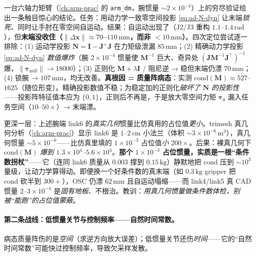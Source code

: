 \begin{insight}
\label{ins:ad-osc-illcond}
一台六轴力矩臂（\cref{ch:arm-prac} 的 \texttt{arm\_dm}，腕惯量 $\sim2\times10^{-4}$）上的穷尽验证给出一条触目惊心的结论。任务：用动力学一致零空间投影 \cref{eq:ad-N-dyn} 让末端\emph{锁死}、同时让手肘在零空间自运动。结果：自运动出现了（J2/J3 重构 $1.1$--$1.4\,\mathrm{rad}$），但\textbf{末端没收住（$\|\Delta\mathbf{x}\|\approx70$--$110\,\mathrm{mm}$，而非 $<10\,\mathrm{mm}$）}。四次定位尝试逐一排除：(1) 运动学投影 $\mathbf{N}=\mathbf{I}-\mathbf{J}^+\mathbf{J}$ 在力矩级泄漏 $85\,\mathrm{mm}$；(2) 精确动力学投影 \cref{eq:ad-N-dyn} \emph{数值爆炸}（腕 $2\times10^{-4}$ 惯量使 $\mathbf{M}^{-1}$ 巨大、奇异处 $(\mathbf{J}\mathbf{M}^{-1}\mathbf{J}^\top)^{-1}$ 爆，$\|\boldsymbol{\tau}_{\text{null}}\|\to18000$）；(3) 正则化 $\mathbf{M}+\lambda\mathbf{I}$ / 阻尼逆 → 稳但末端仍漂 $70\,\mathrm{mm}$；(4) 锁腕 → $107\,\mathrm{mm}$，均无改善。\textbf{真根因 = 质量阵病态}：实测 $\mathrm{cond}(\mathbf{M})\approx527$--$1625$（随位形变）。精确投影数值不稳；为稳定加的正则化\emph{破坏了 $\mathbf{N}$ 的投影性}——投影阵特征值本应为 $\{0,1\}$，正则后不再是，于是放大零空间力矩 $\boldsymbol{\tau}_0$ 漏入任务空间（$10$--$50\times$）→ 末端漂。
\end{insight}

\begin{insight}
\label{ins:ad-placeholder}
更深一层：上述腕端 link6 的\emph{真实几何}惯量比仿真用的占位值\emph{更小}。trimesh 真几何分析（\cref{ch:arm-prac}）显示 link6 是 $1$--$2\,\mathrm{cm}$ 小法兰（体积 $\sim3\times10^{-6}\,\mathrm{m}^3$），真几何惯量 $\sim5\times10^{-6}$——比仿真里填的 $1\times10^{-3}$ 占位值\emph{小 $200\times$}。后果：裸真几何下 $\mathrm{cond}(\mathbf{M})$ \emph{爆到 $1.3\times10^4$--$5.6\times10^4$}。\textbf{那个 $1\times10^{-3}$ 占位惯量，实质是一根“条件数拐杖”}——它（连同 link6 质量从 $0.003$ 撑到 $0.15\,\mathrm{kg}$）静默地把 $\mathrm{cond}$ 压到 $\sim10^3$ 量级，让动力学算得动。即便换一个好条件数的真末端（如 $0.3\,\mathrm{kg}$ gripper 把 $\mathrm{cond}$ 砍半到 $300+$），OSC 仍漂 $62\,\mathrm{mm}$ 且自运动塌缩——而 link4/link5 真 CAD 惯量 $2$--$3\times10^{-4}$ 是\emph{固有地板}、不根治。教训：\emph{用真几何惯量做条件数体检，别被“能跑”的占位值蒙蔽}。
\end{insight}

\paragraph{第二条战线：低惯量关节与控制频率——自然时间常数。}
病态质量阵伤的是\emph{空间}（求逆方向放大误差）；低惯量关节还伤\emph{时间}——它的“自然时间常数”可能快过控制频率，导致欠采样发散。

